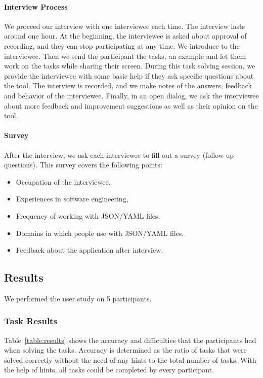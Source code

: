 
\paragraph{Interview Process}
We proceed our interview with one interviewee each time.
The interview lasts around one hour.
At the beginning, the interviewee is asked about approval of recording, and they can stop participating at any time.
We introduce \toolname{} to the interviewee.
Then we send the participant the tasks, an example\cfgfile{} and let them work on the tasks while sharing their screen.
During this task solving session, we provide the interviewee with some basic help if they ask specific questions about the tool.
The interview is recorded, and we make notes of the answers, feedback and behavior of the interviewee.
Finally, in an open dialog, we ask the interviewee about more feedback and improvement suggestions as well as their opinion on the tool.

\paragraph{Survey}
After the interview, we ask each interviewee to fill out a survey (follow-up questions).
This survey covers the following points:
\begin{itemize}
    \item Occupation of the interviewee.
    \item Experiences in software engineering,
    \item Frequency of working with JSON/YAML files.
    \item Domains in which people use with JSON/YAML files.
    \item Feedback about the application after interview.
\end{itemize}

\subsection{Results}\label{subsec:results}
We performed the user study on 5 participants.

\subsubsection{Task Results}
Table~\ref{table:results} shows the accuracy and difficulties that the participants had when solving the tasks.
Accuracy is determined as the ratio of tasks that were solved correctly without the need of any hints to the total number of tasks.
With the help of hints, all tasks could be completed by every participant.

